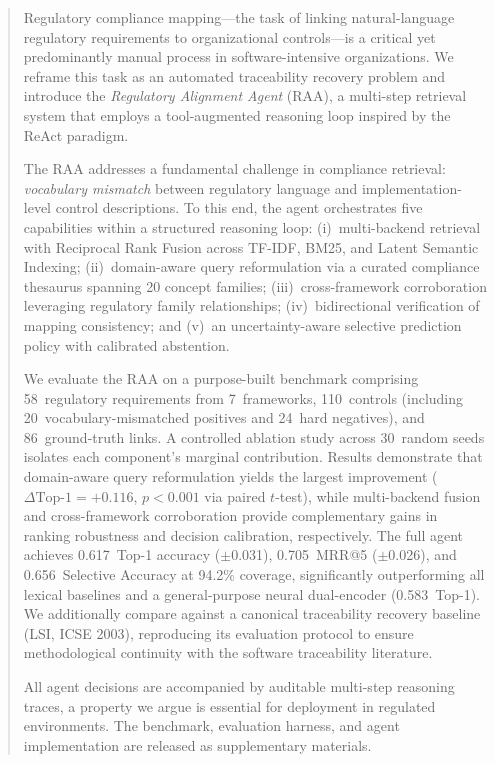 \documentclass[a4paper,fleqn]{cas-sc}
\begin{document}
\begin{abstract}
Regulatory compliance mapping---the task of linking natural-language regulatory requirements to organizational controls---is a critical yet predominantly manual process in software-intensive organizations.
We reframe this task as an automated traceability recovery problem and introduce the \emph{Regulatory Alignment Agent} (RAA), a multi-step retrieval system that employs a tool-augmented reasoning loop inspired by the ReAct paradigm.

The RAA addresses a fundamental challenge in compliance retrieval: \emph{vocabulary mismatch} between regulatory language and implementation-level control descriptions.
To this end, the agent orchestrates five capabilities within a structured reasoning loop: (i)~multi-backend retrieval with Reciprocal Rank Fusion across TF-IDF, BM25, and Latent Semantic Indexing; (ii)~domain-aware query reformulation via a curated compliance thesaurus spanning 20 concept families; (iii)~cross-framework corroboration leveraging regulatory family relationships; (iv)~bidirectional verification of mapping consistency; and (v)~an uncertainty-aware selective prediction policy with calibrated abstention.

We evaluate the RAA on a purpose-built benchmark comprising 58~regulatory requirements from 7~frameworks, 110~controls (including 20~vocabulary-mismatched positives and 24~hard negatives), and 86~ground-truth links.
A controlled ablation study across 30~random seeds isolates each component's marginal contribution.
Results demonstrate that domain-aware query reformulation yields the largest improvement ($\Delta\text{Top-1} = +0.116$, $p < 0.001$ via paired $t$-test), while multi-backend fusion and cross-framework corroboration provide complementary gains in ranking robustness and decision calibration, respectively.
The full agent achieves 0.617~Top-1 accuracy ($\pm$0.031), 0.705~MRR@5 ($\pm$0.026), and 0.656~Selective Accuracy at 94.2\% coverage, significantly outperforming all lexical baselines and a general-purpose neural dual-encoder (0.583~Top-1).
We additionally compare against a canonical traceability recovery baseline (LSI, ICSE 2003), reproducing its evaluation protocol to ensure methodological continuity with the software traceability literature.

All agent decisions are accompanied by auditable multi-step reasoning traces, a property we argue is essential for deployment in regulated environments.
The benchmark, evaluation harness, and agent implementation are released as supplementary materials.
\end{abstract}
\end{document}
